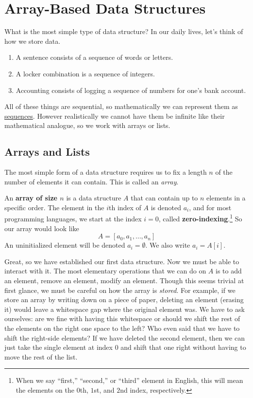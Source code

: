 \section{Array-Based Data Structures} 

  What is the most simple type of data structure? In our daily lives, let's think of how we store data. 
  \begin{enumerate}
    \item A sentence consists of a sequence of words or letters. 
    \item A locker combination is a sequence of integers. 
    \item Accounting consists of logging a sequence of numbers for one's bank account. 
  \end{enumerate} 

  All of these things are sequential, so mathematically we can represent them as \href{st-def:sequence}{sequences}. However realistically we cannot have them be infinite like their mathematical analogue, so we work with arrays or lists.  

\subsection{Arrays and Lists} 

  The most simple form of a data structure requires us to fix a length $n$ of the number of elements it can contain. This is called an \textit{array}. 

  \begin{definition}[Array]
    An \textbf{array of size $n$} is a data structure $A$ that can contain up to $n$ elements in a specific order. The element in the $i$th index of $A$ is denoted $a_i$, and for most programming languages, we start at the index $i=0$, called \textbf{zero-indexing}.\footnote{When we say ``first,'' ``second,'' or ``third'' element in English, this will mean the elements on the $0$th, $1$st, and $2$nd index, respectively.} So our array would look like
    \begin{equation}
      A = [a_0, a_1, \ldots, a_n]
    \end{equation} 
    An uninitialized element will be denoted $a_i = \emptyset$. We also write $a_i = A[i]$. 
  \end{definition} 

  Great, so we have established our first data structure. Now we must be able to interact with it. The most elementary operations that we can do on $A$ is to add an element, remove an element, modify an element. Though this seems trivial at first glance, we must be careful on how the array is \textit{stored}. For example, if we store an array by writing down on a piece of paper, deleting an element (erasing it) would leave a whitespace gap where the original element was. We have to ask ourselves: are we fine with having this whitespace or should we shift the rest of the elements on the right one space to the left? Who even said that we have to shift the right-side elements? If we have deleted the second element, then we can just take the single element at index $0$ and shift that one right without having to move the rest of the list. 

